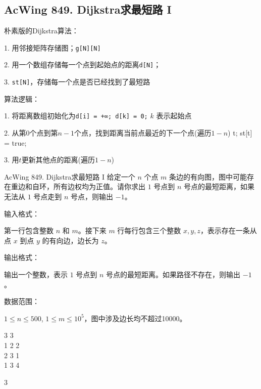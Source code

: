 \subsection{AcWing 849. Dijkstra求最短路 I}

朴素版的Dijkstra算法：

1. 用邻接矩阵存储图；\lstinline{g[N][N]}

2. 用一个数组存储每一个点到起始点的距离\lstinline{d[N]}；

3. \lstinline{st[N]}，存储每一个点是否已经找到了最短路

算法逻辑：

1. 将距离数组初始化为\lstinline{d[i] = +∞; d[k] = 0;} $k$ 表示起始点

2. 从第$0$个点到第$n - 1$个点，找到距离当前点最近的下一个点(遍历$1 - n$) \lstinline{}{t; st[t] = true;}

3. 用$t$更新其他点的距离(遍历$1 - n$)


\begin{titledbox}{AcWing 849. Dijkstra求最短路 I}
    给定一个 $n$ 个点 $m$ 条边的有向图，图中可能存在重边和自环，所有边权均为正值。请你求出 $1$ 号点到 $n$ 号点的最短距离，如果无法从 $1$ 号点走到 $n$ 号点，则输出 $-1$。

    输入格式：

    第一行包含整数 $n$ 和 $m$。接下来 $m$ 行每行包含三个整数 $x,y,z$，表示存在一条从点 $x$ 到点 $y$ 的有向边，边长为 $z$。

    输出格式：

    输出一个整数，表示 $1$ 号点到 $n$ 号点的最短距离。如果路径不存在，则输出 $-1$。

    数据范围：

    $1 \le n \le 500$, $1 \le m \le 10^5$，图中涉及边长均不超过10000。

    \begin{inputblock}
        3 3 \\
        1 2 2 \\
        2 3 1 \\
        1 3 4
    \end{inputblock}
    \begin{outputblock}
        3
    \end{outputblock}
\end{titledbox}

